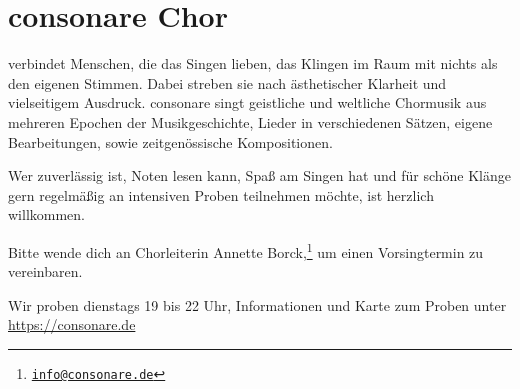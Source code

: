 \section*{consonare Chor}
\label{sec:consonare_chor}

 verbindet Menschen, die das Singen lieben, das Klingen im Raum mit nichts als den eigenen Stimmen. Dabei streben sie nach ästhetischer Klarheit und vielseitigem Ausdruck.
%
consonare singt geistliche und weltliche Chormusik aus mehreren Epochen der Musikgeschichte, Lieder in verschiedenen Sätzen, eigene Bearbeitungen, sowie zeitgenössische Kompositionen.

Wer zuverlässig ist, Noten lesen kann, Spaß am Singen hat und für schöne Klänge gern regelmäßig an intensiven Proben teilnehmen möchte, ist herzlich willkommen.

Bitte wende dich an Chorleiterin Annette Borck,\footnote%
{\href{mailto:info@consonare.de}{\nolinkurl{info@consonare.de}}}%
 um einen Vorsingtermin zu vereinbaren.

Wir proben dienstags 19 bis 22 Uhr,
Informationen und Karte zum Proben unter \url{https://consonare.de}

